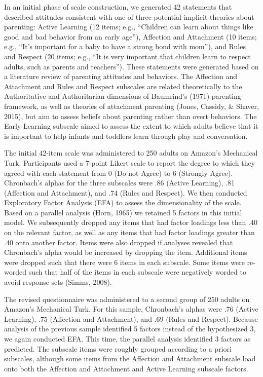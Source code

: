 \documentclass[10pt, letterpaper]{article}
\begin{document}
In an initial phase of scale construction, we generated 42 statements
that described attitudes consistent with one of three potential implicit
theories about parenting: Active Learning (12 items; e.g., ``Children
can learn about things like good and bad behavior from an early age''),
Affection and Attachment (10 items; e.g., ``It's important for a baby to
have a strong bond with mom''), and Rules and Respect (20 items; e.g.,
``It is very important that children learn to respect adults, such as
parents and teachers''). These statements were generated based on a
literature review of parenting attitudes and behaviors. The Affection
and Attachment and Rules and Respect subscales are related theoretically
to the Authoritative and Authoritarian dimensions of Baumrind's (1971)
parenting framework, as well as theories of attachment parenting (Jones,
Cassidy, \& Shaver, 2015), but aim to assess beliefs about parenting
rather than overt behaviors. The Early Learning subscale aimed to assess
the extent to which adults believe that it is important to help infants
and toddlers learn through play and conversation.

The initial 42-item scale was administered to 250 adults on Amazon's
Mechanical Turk. Participants used a 7-point Likert scale to report the
degree to which they agreed with each statement from 0 (Do not Agree) to
6 (Strongly Agree). Chronbach's alphas for the three subscales were .86
(Active Learning), .81 (Affection and Attachment), and .74 (Rules and
Respect). We then conducted Exploratory Factor Analysis (EFA) to assess
the dimensionality of the scale. Based on a parallel analysis (Horn,
1965) we retained 5 factors in this initial model. We subsequently
dropped any items that had factor loadings less than .40 on the relevant
factor, as well as any items that had factor loadings greater than .40
onto another factor. Items were also dropped if analyses revealed that
Chronbach's alpha would be increased by dropping the item. Additional
items were dropped such that there were 6 items in each subscale. Some
items were re-worded such that half of the items in each subscale were
negatively worded to avoid response sets (Simms, 2008).

The revised questionnaire was administered to a second group of 250
adults on Amazon's Mechanical Turk. For this sample, Chronbach's alphas
were .76 (Active Learning), .75 (Affection and Attachment), and .69
(Rules and Respect). Because analysis of the previous sample identified
5 factors instead of the hypothesized 3, we again conducted EFA. This
time, the parallel analysis identified 3 factors as predicted. The
subscale items were roughly grouped according to a priori subscales,
although some items from the Affection and Attachment subscale load onto
both the Affection and Attachment and Active Learning subscale factors.
\end{document}
